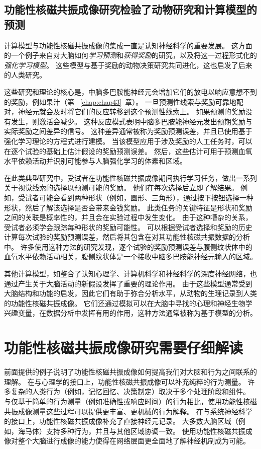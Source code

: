 \subsection{功能性核磁共振成像研究检验了动物研究和计算模型的预测}

计算模型与功能性核磁共振成像的集成一直是认知神经科学的重要发展。
这方面的一个例子来自对大脑如何\textit{学习预测}和\textit{获得奖励}的研究，以及将这一过程形式化的\textit{强化学习模型}。
这些模型与基于奖励的动物决策研究共同进化，这也启发了后来的人类研究。


这些研究和理论的核心是，中脑多巴胺能神经元会增加它们的放电以响应意想不到的奖励，例如果汁（第 ~\ref{chap:chap43}~章）。 
一旦预测性线索与奖励可靠地配对，神经元就会及时将它们的反应转移到这个预测性线索上。
如果预测的奖励没有发生，则激活会减少。
这种反应模式表明中脑多巴胺能神经元发出预期奖励与实际奖励之间差异的信号。
这种差异通常被称为奖励预测误差，并且已使用基于强化学习理论的方程式进行建模。
当该模型应用于涉及奖励的人工任务时，可以在逐个试验的基础上估计假设的奖励预测误差。
然后，这些估计可用于预测血氧水平依赖活动并识别可能参与人脑强化学习的体素和区域。


在此类典型研究中，受试者在功能性核磁共振成像期间执行学习任务，做出一系列关于视觉线索的选择以预测可能的奖励。
他们在每次选择后立即了解结果。
例如，受试者可能会看到两种形状（例如，圆形、三角形），通过按下按钮选择一种形状，然后了解该选择是否会带来金钱奖励。
此类任务的关键特征是形状和奖励之间的关联是概率性的，并且会在实验过程中发生变化。
由于这种嘈杂的关系，受试者必须学会跟踪每种形状的奖励可能性。
可以根据受试者选择和奖励的历史计算每次试验的奖励预测误差，然后将其包含在对其功能性核磁共振数据的分析中。
许多使用这种方法的研究发现，逐个试验的奖励预测误差与腹侧纹状体中的血氧水平依赖活动相关，腹侧纹状体是一个接收中脑多巴胺能神经元输入的区域。


其他计算模型，如整合了认知心理学、计算机科学和神经科学的深度神经网络，也通过产生关于大脑活动的新假设发挥了重要的理论作用。
由于这些模型通常受到大脑结构和功能的启发，因此它们有助于弥合分析水平，从动物的生理记录到人类的功能性核磁共振成像。 
它们还通过模拟可以在大脑中寻找的心理和神经生物学兴趣变量，在数据分析中发挥有用的作用，这种方法通常被称为基于模型的分析。



\section{功能性核磁共振成像研究需要仔细解读}

前面提供的例子说明了功能性核磁共振成像如何提高我们对大脑和行为之间联系的理解。 
在与心理学的接口上，功能性核磁共振成像可以补充纯粹的行为测量。
许多复杂的人类行为（例如，记忆回忆、决策制定）取决于多个处理阶段和组件。
与仅基于简单的行为测量（例如准确性或响应时间）的行为相比，使用功能性核磁共振成像测量这些过程可以提供更丰富、更机械的行为解释。
在与系统神经科学的接口上，功能性核磁共振成像补充了直接神经元记录。
大多数大脑区域（例如，海马体）支持多种行为，并且与其他区域协调一致。
使用功能性核磁共振成像对整个大脑进行成像的能力使得在网络层面更全面地了解神经机制成为可能。


